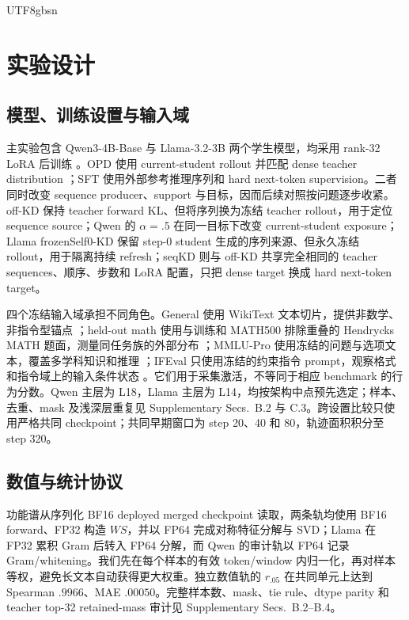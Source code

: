 \documentclass[letterpaper]{article} %
\begin{document}
\begin{CJK*}{UTF8}{gbsn}
\section{实验设计}

\subsection{模型、训练设置与输入域}

主实验包含 Qwen3-4B-Base 与 Llama-3.2-3B 两个学生模型，均采用 rank-32 LoRA 后训练 \citep{hu2022lora,qwen2025technical,meta2024llama32}。OPD 使用 current-student rollout 并匹配 dense teacher distribution \citep{verl2025opd}；SFT 使用外部参考推理序列和 hard next-token supervision。二者同时改变 sequence producer、support 与目标，因而后续对照按问题逐步收紧。off-KD 保持 teacher forward KL、但将序列换为冻结 teacher rollout，用于定位 sequence source；Qwen 的 $\alpha=.5$ 在同一目标下改变 current-student exposure；Llama frozenSelf0-KD 保留 step-0 student 生成的序列来源、但永久冻结 rollout，用于隔离持续 refresh；seqKD 则与 off-KD 共享完全相同的 teacher sequences、顺序、步数和 LoRA 配置，只把 dense target 换成 hard next-token target。

四个冻结输入域承担不同角色。General 使用 WikiText 文本切片，提供非数学、非指令型锚点 \citep{merity2017pointer}；held-out math 使用与训练和 MATH500 排除重叠的 Hendrycks MATH 题面，测量同任务族的外部分布 \citep{hendrycks2021math}；MMLU-Pro 使用冻结的问题与选项文本，覆盖多学科知识和推理 \citep{wang2024mmlupro}；IFEval 只使用冻结的约束指令 prompt，观察格式和指令域上的输入条件状态 \citep{zhou2023ifeval}。它们用于采集激活，不等同于相应 benchmark 的行为分数。Qwen 主层为 L18，Llama 主层为 L14，均按架构中点预先选定；样本、去重、mask 及浅深层重复见 Supplementary Secs.~B.2 与 C.3。跨设置比较只使用严格共同 checkpoint；共同早期窗口为 step 20、40 和 80，轨迹面积积分至 step 320。

\subsection{数值与统计协议}

功能谱从序列化 BF16 deployed merged checkpoint 读取，两条轨均使用 BF16 forward、FP32 构造 $WS$，并以 FP64 完成对称特征分解与 SVD；Llama 在 FP32 累积 Gram 后转入 FP64 分解，而 Qwen 的审计轨以 FP64 记录 Gram/whitening。我们先在每个样本的有效 token/window 内归一化，再对样本等权，避免长文本自动获得更大权重。独立数值轨的 $r_{.05}$ 在共同单元上达到 Spearman $.9966$、MAE $.00050$。完整样本数、mask、tie rule、dtype parity 和 teacher top-32 retained-mass 审计见 Supplementary Secs.~B.2--B.4。


\end{CJK*}
\end{document}
